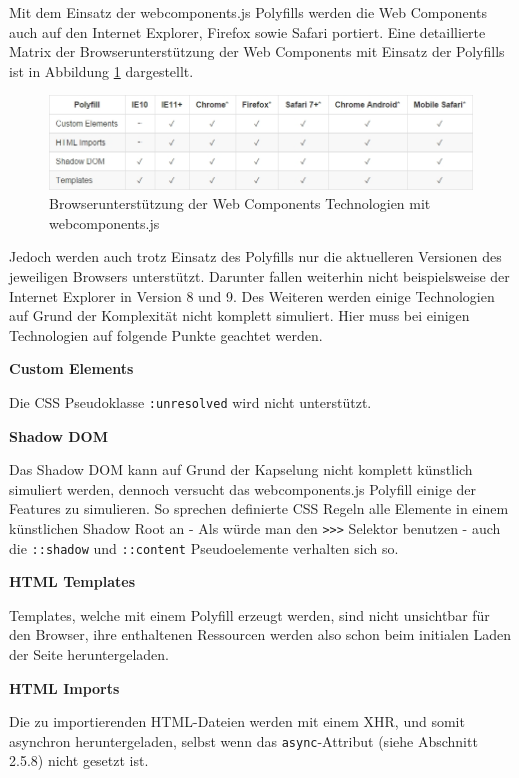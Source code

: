 Mit dem Einsatz der webcomponents.js Polyfills werden die Web Components auch auf den Internet Explorer, Firefox sowie Safari portiert. Eine detaillierte Matrix der Browserunterstützung der Web Components mit Einsatz der Polyfills ist in Abbildung \ref{fig:bdwctmwcjs} \cite{citeulike:13914238} dargestellt.

\begin{figure}[htbp]
 \centering
 \includegraphics[width=\linewidth]{kapitel2/bilder/6-webcomponentsjs-browserunterstuetzung}
 \caption{Browserunterstützung der Web Components Technologien mit webcomponents.js}
 \label{fig:bdwctmwcjs}
\end{figure}

Jedoch werden auch trotz Einsatz des Polyfills nur die aktuelleren Versionen des jeweiligen Browsers unterstützt. Darunter fallen weiterhin nicht beispielsweise der Internet Explorer in Version 8 und 9. Des Weiteren werden einige Technologien auf Grund der Komplexität nicht komplett simuliert. Hier muss bei einigen Technologien auf folgende Punkte geachtet werden.

\textbf{Custom Elements}

Die CSS Pseudoklasse \texttt{:unresolved} wird nicht unterstützt.

\textbf{Shadow DOM}

Das Shadow DOM kann auf Grund der Kapselung nicht komplett künstlich simuliert werden, dennoch versucht das webcomponents.js Polyfill einige der Features zu simulieren. So sprechen definierte CSS Regeln alle Elemente in einem künstlichen Shadow Root an - Als würde man den \texttt{\textgreater{}\textgreater{}\textgreater{}} Selektor benutzen - auch die \texttt{::shadow} und \texttt{::content} Pseudoelemente verhalten sich so.

\textbf{HTML Templates}

Templates, welche mit einem Polyfill erzeugt werden, sind nicht unsichtbar für den Browser, ihre enthaltenen Ressourcen werden also schon beim initialen Laden der Seite heruntergeladen.

\textbf{HTML Imports}

Die zu importierenden HTML-Dateien werden mit einem XHR, und somit asynchron heruntergeladen, selbst wenn das \texttt{async}-Attribut (siehe Abschnitt 2.5.8) nicht gesetzt ist.


